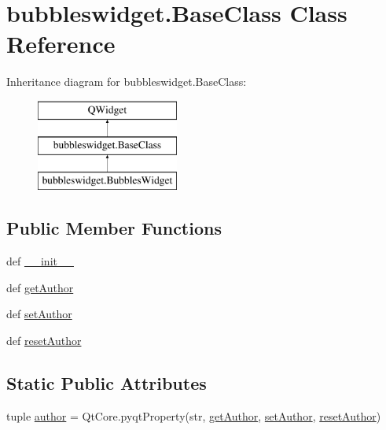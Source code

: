 \hypertarget{classbubbleswidget_1_1BaseClass}{}\section{bubbleswidget.\+Base\+Class Class Reference}
\label{classbubbleswidget_1_1BaseClass}
Inheritance diagram for bubbleswidget.\+Base\+Class\+:\begin{figure}[H]
\begin{center}
\leavevmode
\includegraphics[height=3.000000cm]{classbubbleswidget_1_1BaseClass}
\end{center}
\end{figure}
\subsection*{Public Member Functions}
\begin{DoxyCompactItemize}
\item 
def \hyperlink{classbubbleswidget_1_1BaseClass_a6dd2d2088f3cb4bc9f96bb79f4802b12}{\+\_\+\+\_\+init\+\_\+\+\_\+}
\item 
def \hyperlink{classbubbleswidget_1_1BaseClass_ad299d436ad6544cf72bad33e8c67f2a0}{get\+Author}
\item 
def \hyperlink{classbubbleswidget_1_1BaseClass_a39455653eafd7ccc567e2522eb1e254e}{set\+Author}
\item 
def \hyperlink{classbubbleswidget_1_1BaseClass_a11799045c20d253b75330fb12699c647}{reset\+Author}
\end{DoxyCompactItemize}
\subsection*{Static Public Attributes}
\begin{DoxyCompactItemize}
\item 
tuple \hyperlink{classbubbleswidget_1_1BaseClass_a09650df94d249c57aafd082ddfad5b19}{author} = Qt\+Core.\+pyqt\+Property(str, \hyperlink{classbubbleswidget_1_1BaseClass_ad299d436ad6544cf72bad33e8c67f2a0}{get\+Author}, \hyperlink{classbubbleswidget_1_1BaseClass_a39455653eafd7ccc567e2522eb1e254e}{set\+Author}, \hyperlink{classbubbleswidget_1_1BaseClass_a11799045c20d253b75330fb12699c647}{reset\+Author})
\end{DoxyCompactItemize}


